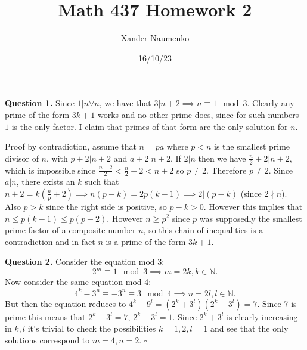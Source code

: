 \documentclass[letterpaper, reqno,11pt]{article}
\begin{document}
\title{Math 437 Homework 2}
\date{16/10/23}
\author{Xander Naumenko}
\maketitle

{\medskip\noindent\bf Question 1.} Since $1|n\forall n$, we have that $3|n+2\implies n\equiv 1\mod 3$. Clearly any prime of the form $3k+1$ works and no other prime does, since for such numbers $1$ is the only factor. I claim that primes of that form are the only solution for $n$. 

Proof by contradiction, assume that $n=pa$ where $p<n$ is the smallest prime divisor of $n$, with $p+2|n+2$ and $a+2|n+2$. If $2|n$ then we have $\frac{n}{2}+2|n+2$, which is impossible since $\frac{n+2}{2}<\frac{n}{2}+2<n+2$ so $p\neq 2$. Therefore $p\neq 2$. Since $a|n$, there exists an $k$ such that $n+2=k\left( \frac{n}{p}+2 \right)\implies n(p-k)=2p(k-1)\implies 2| (p-k)$ (since $2\nmid n$). Also $p>k$ since the right side is positive, so $p-k>0$. However this implies that $n\leq p(k-1)\leq p(p-2)$. However $n\geq p^2$ since $p$ was supposedly the smallest prime factor of a composite number $n$, so this chain of inequalities is a contradiction and in fact $n$ is a prime of the form $3k+1$.



{\medskip\noindent\bf Question 2.} Consider the equation mod 3:
\[
2^{m}\equiv 1\mod 3\implies m=2k, k\in \mathbb{N}
.\]
Now consider the same equation mod 4:
\[
4^{k}-3^{n}\equiv -3^{n}\equiv 3\mod 4\implies n=2l, l\in \mathbb{N}
.\]
But then the equation reduces to $4^{k}-9^{l}=(2^{k}+3^{l})(2^{k}-3^{l})=7$. Since 7 is prime this means that $2^{k}+3^{l}=7$, $2^{k}-3^{l}=1$. Since $2^{k}+3^{l}$ is clearly increasing in $k,l$ it's trivial to check the possibilities $k=1,2,l=1$ and see that the only solutions correspond to $m=4,n=2$. $\square$
\end{document}

